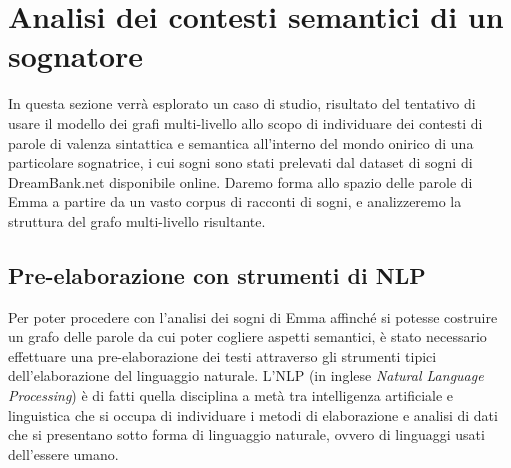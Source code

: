\section{Analisi dei contesti semantici di un sognatore}\label{sec:analisi-dei-contesti-semantici-di-un-sognatore}

In questa sezione verrà esplorato un caso di studio, risultato del tentativo di usare il modello dei grafi multi-livello
allo scopo di individuare dei contesti di parole di valenza sintattica e semantica all'interno del mondo onirico
di una particolare sognatrice, i cui sogni sono stati prelevati dal dataset di sogni di DreamBank.net disponibile
online.
Daremo forma allo spazio delle parole di Emma a partire da un vasto corpus di racconti di sogni, e analizzeremo la
struttura del grafo multi-livello risultante.

\subsection{Pre-elaborazione con strumenti di NLP}\label{subec:pre-elaborazione-con-NLP}
Per poter procedere con l'analisi dei sogni di Emma affinché si potesse costruire un grafo delle parole
da cui poter cogliere aspetti semantici, è stato necessario effettuare una pre-elaborazione dei testi
attraverso gli strumenti tipici dell'elaborazione del linguaggio naturale.
L'NLP (in inglese \textit{Natural Language Processing}) è di fatti quella disciplina a metà tra intelligenza artificiale
e linguistica che si occupa di individuare i metodi di elaborazione e analisi di dati che si presentano sotto forma di
linguaggio naturale, ovvero di linguaggi usati dell'essere umano. \newline

